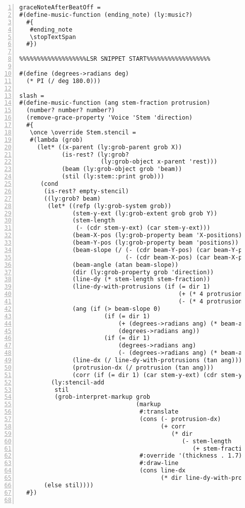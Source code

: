 \begin{Verbatim}[numbers=left,xleftmargin=5mm]
graceNoteAfterBeatOff =
#(define-music-function (ending_note) (ly:music?)
  #{
   #ending_note
   \stopTextSpan
  #})

%%%%%%%%%%%%%%%%%%%LSR SNIPPET START%%%%%%%%%%%%%%%%%%

#(define (degrees->radians deg)
  (* PI (/ deg 180.0)))

slash =
#(define-music-function (ang stem-fraction protrusion)
  (number? number? number?)
  (remove-grace-property 'Voice 'Stem 'direction)
  #{
   \once \override Stem.stencil =
   #(lambda (grob)
     (let* ((x-parent (ly:grob-parent grob X))
            (is-rest? (ly:grob?
                       (ly:grob-object x-parent 'rest)))
            (beam (ly:grob-object grob 'beam))
            (stil (ly:stem::print grob)))
      (cond
       (is-rest? empty-stencil)
       ((ly:grob? beam)
        (let* ((refp (ly:grob-system grob))
               (stem-y-ext (ly:grob-extent grob grob Y))
               (stem-length
                (- (cdr stem-y-ext) (car stem-y-ext)))
               (beam-X-pos (ly:grob-property beam 'X-positions))
               (beam-Y-pos (ly:grob-property beam 'positions))
               (beam-slope (/ (- (cdr beam-Y-pos) (car beam-Y-pos))
                              (- (cdr beam-X-pos) (car beam-X-pos))))
               (beam-angle (atan beam-slope))
               (dir (ly:grob-property grob 'direction))
               (line-dy (* stem-length stem-fraction))
               (line-dy-with-protrusions (if (= dir 1)
                                             (+ (* 4 protrusion) beam-angle)
                                             (- (* 4 protrusion) beam-angle)))
               (ang (if (> beam-slope 0)
                        (if (= dir 1)
                            (+ (degrees->radians ang) (* beam-angle 0.7))
                            (degrees->radians ang))
                        (if (= dir 1)
                            (degrees->radians ang)
                            (- (degrees->radians ang) (* beam-angle 0.7)))))
               (line-dx (/ line-dy-with-protrusions (tan ang)))
               (protrusion-dx (/ protrusion (tan ang)))
               (corr (if (= dir 1) (car stem-y-ext) (cdr stem-y-ext))))
         (ly:stencil-add
          stil
          (grob-interpret-markup grob
                                 (markup
                                  #:translate
                                  (cons (- protrusion-dx)
                                        (+ corr
                                           (* dir
                                              (- stem-length
                                                 (+ stem-fraction protrusion)))))
                                  #:override '(thickness . 1.7)
                                  #:draw-line
                                  (cons line-dx
                                        (* dir line-dy-with-protrusions)))))))
       (else stil))))
  #})


\end{Verbatim}
